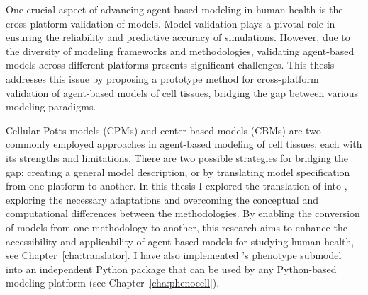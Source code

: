 One crucial aspect of advancing agent-based modeling in human health is the cross-platform validation of models. Model validation plays a pivotal role in ensuring the reliability and predictive accuracy of simulations. However, due to the diversity of modeling frameworks and methodologies, validating agent-based models across different platforms presents significant challenges. This thesis addresses this issue by proposing a prototype method for cross-platform validation of agent-based models of cell tissues, bridging the gap between various modeling paradigms. 

Cellular Potts models (CPMs) and center-based models (CBMs) are two commonly employed approaches in agent-based modeling of cell tissues, each with its strengths and limitations.
 There are two possible strategies for bridging the gap: creating a general model description, or by translating model specification from one platform to another. In this thesis I explored the translation of \pscs into \ccd,
exploring the necessary adaptations and overcoming the conceptual and computational differences between the methodologies. By enabling the conversion of models from one methodology to another, this research aims to enhance the accessibility and applicability of agent-based models for studying human health, see Chapter~\ref{cha:translator}. I have also implemented \psc's phenotype submodel~\cite{ghaffarizadeh_physicell_2018} into an independent Python package that can be used by any Python-based modeling platform (see Chapter~\ref{cha:phenocell}).



 